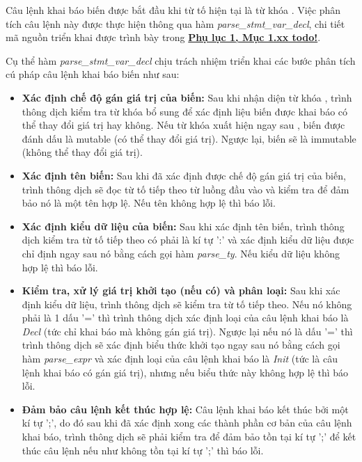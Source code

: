 Câu lệnh khai báo biến được bắt đầu khi từ tố hiện tại là từ khóa . Việc phân tích câu lệnh này được thực hiện thông qua hàm \textit{parse\_stmt\_var\_decl}, chi tiết mã nguồn triển khai được trình bày trong \hyperref[ap1:stmt_decl_var]{\bf Phụ lục 1, Mục 1.xx todo!}.

Cụ thể hàm \textit{parse\_stmt\_var\_decl} chịu trách nhiệm triển khai các bước phân tích cú pháp câu lệnh khai báo biến như sau:

\begin{itemize}
    \item \textbf{Xác định chế độ gán giá trị của biến:}
    Sau khi nhận diện từ khóa , trình thông dịch kiểm tra từ khóa bổ sung để xác định liệu biến được khai báo có thể thay đổi giá trị hay không. Nếu từ khóa  xuất hiện ngay sau , biến được đánh dấu là mutable (có thể thay đổi giá trị). Ngược lại, biến sẽ là immutable (không thể thay đổi giá trị).
    \item \textbf{Xác định tên biến:}
    Sau khi đã xác định được chế độ gán giá trị của biến, trình thông dịch sẽ đọc từ tố tiếp theo từ luồng đầu vào và kiểm tra để đảm bảo nó là một tên hợp lệ. Nếu tên không hợp lệ thì báo lỗi. 
    \item \textbf{Xác định kiểu dữ liệu của biến:}
    Sau khi xác định tên biến, trình thông dịch kiểm tra từ tố tiếp theo có phải là kí tự ':' và xác định kiểu dữ liệu được chỉ định ngay sau nó bằng cách gọi hàm \textit{parse\_ty}. Nếu kiểu dữ liệu không hợp lệ thì báo lỗi. 
    \item \textbf{Kiểm tra, xử lý giá trị khởi tạo (nếu có) và phân loại:}
    Sau khi xác định kiểu dữ liệu, trình thông dịch sẽ kiểm tra từ tố tiếp theo. Nếu nó không phải là 1 dấu '=' thì trình thông dịch xác định loại của câu lệnh khai báo là \textit{Decl} (tức chỉ khai báo mà không gán giá trị). Ngược lại nếu nó là dấu '=' thì trình thông dịch sẽ xác định biểu thức khởi tạo ngay sau nó bằng cách gọi hàm \textit{parse\_expr} và xác định loại của câu lệnh khai báo là \textit{Init} (tức là câu lệnh khai báo có gán giá trị), nhưng nếu biểu thức này không hợp lệ thì báo lỗi. 
    \item \textbf{Đảm bảo câu lệnh kết thúc hợp lệ:}
    Câu lệnh khai báo kết thúc bởi một kí tự ';', do đó sau khi đã xác định xong các thành phần cơ bản của câu lệnh khai báo, trình thông dịch sẽ phải kiểm tra để đảm bảo tồn tại kí tự ';' để kết thúc câu lệnh nếu như không tồn tại kí tự ';' thì báo lỗi. %
\end{itemize}


